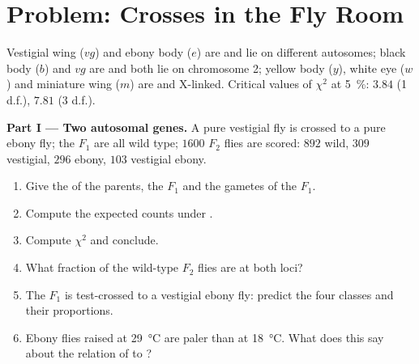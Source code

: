 \section{Problem: Crosses in the Fly Room}

\begin{problem}
\label{pb:b2:meiosis-heredity:1}
Vestigial wing ($vg$) and ebony body ($e$) are  and lie on
different autosomes; black body ($b$) and $vg$ are  and both
lie on chromosome 2; yellow body ($y$), white eye ($w$) and miniature
wing ($m$) are  and X-linked. Critical values of $\chi^2$ at
\qty{5}{\%}: $3.84$ (1 d.f.), $7.81$ (3 d.f.).

\medskip
\noindent\textbf{Part I --- Two autosomal genes.}
A pure vestigial fly is crossed to a pure ebony fly; the $F_1$ are
all wild type; $1600$ $F_2$ flies are scored: $892$ wild, $309$
vestigial, $296$ ebony, $103$ vestigial ebony.
\begin{enumerate}
  \item Give the  of the parents, the $F_1$ and the gametes
        of the $F_1$.
  \item Compute the expected counts under .
  \item Compute $\chi^2$ and conclude.
  \item What fraction of the wild-type $F_2$ flies are  at
        both loci?
  \item The $F_1$ is test-crossed to a vestigial ebony fly: predict
        the four classes and their proportions.
  \item Ebony flies raised at \qty{29}{\celsius} are paler than at
        \qty{18}{\celsius}. What does this say about the relation of
         to ?
\end{enumerate}


\end{problem}
